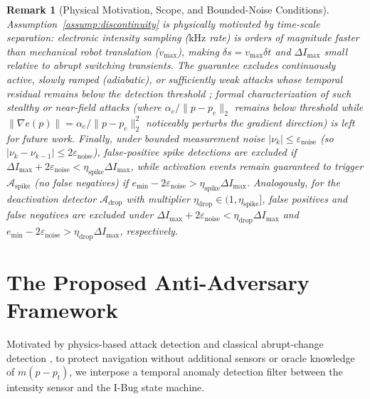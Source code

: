 \documentclass[12pt, a4paper]{article}
\newtheorem{remark}{Remark}
\begin{document}
\begin{remark}[Physical Motivation, Scope, and Bounded-Noise Conditions]
\label{rem:physical_justification}
Assumption~\ref{assump:discontinuity} is physically motivated by time-scale separation: electronic intensity sampling ($\text{kHz}$ rate) is orders of magnitude faster than mechanical robot translation ($v_{\max}$), making $\delta s = v_{\max}\delta t$ and $\Delta I_{\max}$ small relative to abrupt switching transients. The guarantee excludes continuously active, slowly ramped (adiabatic), or sufficiently weak attacks whose temporal residual remains below the detection threshold \cite{psiaki2016gnss}; formal characterization of such stealthy or near-field attacks (where $\alpha_e / \|p - p_e\|_2$ remains below threshold while $\|\nabla e(p)\| = \alpha_e / \|p - p_e\|_2^2$ noticeably perturbs the gradient direction) is left for future work. Finally, under bounded measurement noise $|\nu_k| \le \varepsilon_{\text{noise}}$ (so $|\nu_k - \nu_{k-1}| \le 2\varepsilon_{\text{noise}}$), false-positive spike detections are excluded if $\Delta I_{\max} + 2\varepsilon_{\text{noise}} < \eta_{\text{spike}}\Delta I_{\max}$, while activation events remain guaranteed to trigger $\mathcal{A}_{\text{spike}}$ (no false negatives) if $e_{\min} - 2\varepsilon_{\text{noise}} > \eta_{\text{spike}}\Delta I_{\max}$. Analogously, for the deactivation detector $\mathcal{A}_{\text{drop}}$ with multiplier $\eta_{\text{drop}} \in (1, \eta_{\text{spike}}]$, false positives and false negatives are excluded under $\Delta I_{\max} + 2\varepsilon_{\text{noise}} < \eta_{\text{drop}}\Delta I_{\max}$ and $e_{\min} - 2\varepsilon_{\text{noise}} > \eta_{\text{drop}}\Delta I_{\max}$, respectively.
\end{remark}

\section{The Proposed Anti-Adversary Framework}
\label{sec:algorithm}
Motivated by physics-based attack detection \cite{giraldo2018survey} and classical abrupt-change detection \cite{basseville1993detection}, to protect navigation without additional sensors or oracle knowledge of $m(p - p_t)$, we interpose a temporal anomaly detection filter between the intensity sensor and the I-Bug state machine.
\end{document}
